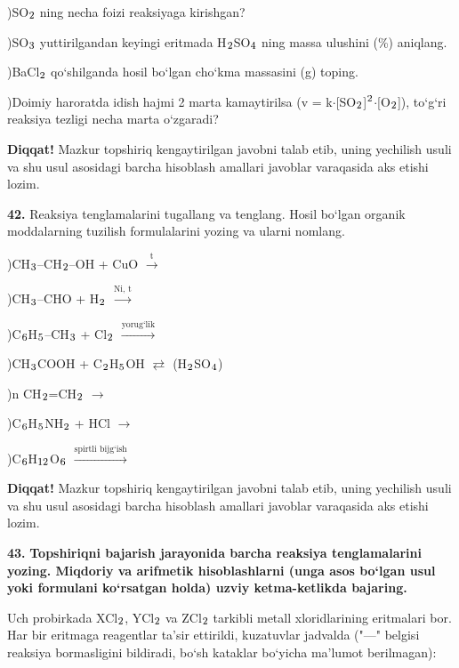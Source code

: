 \documentclass[11pt,a4paper]{article}
\renewcommand{\textsubscript}[1]{\ensuremath{_{\text{\fontsize{8}{8}\selectfont #1}}}}
\renewcommand{\textsuperscript}[1]{\ensuremath{^{\text{\fontsize{8}{8}\selectfont #1}}}}
\newcommand{\diqqat}[1]{\par\smallskip\noindent\textbf{Diqqat!} #1\par\medskip}
\begin{document}
)SO\textsubscript{2} ning necha foizi reaksiyaga kirishgan?\par
{})SO\textsubscript{3} yuttirilgandan keyingi eritmada H\textsubscript{2}SO\textsubscript{4} ning massa ulushini (\%) aniqlang.\par
{})BaCl\textsubscript{2} qo`shilganda hosil bo`lgan cho`kma massasini (g) toping.\par
{})Doimiy haroratda idish hajmi 2 marta kamaytirilsa (v = k$\cdot$[SO\textsubscript{2}]\textsuperscript{2}$\cdot$[O\textsubscript{2}]), to`g`ri reaksiya tezligi necha marta o`zgaradi?\par
\diqqat{Mazkur topshiriq kengaytirilgan javobni talab etib, uning yechilish usuli va shu usul asosidagi barcha hisoblash amallari javoblar varaqasida aks etishi lozim.}
\noindent\textbf{42.} Reaksiya tenglamalarini tugallang va tenglang. Hosil bo`lgan organik moddalarning tuzilish formulalarini yozing va ularni nomlang.\par
{})CH\textsubscript{3}--CH\textsubscript{2}--OH + CuO $\xrightarrow{\text{t}}$\par
{})CH\textsubscript{3}--CHO + H\textsubscript{2} $\xrightarrow{\text{Ni, t}}$\par
{})C\textsubscript{6}H\textsubscript{5}--CH\textsubscript{3} + Cl\textsubscript{2} $\xrightarrow{\text{yorug`lik}}$\par
{})CH\textsubscript{3}COOH + C\textsubscript{2}H\textsubscript{5}OH $\rightleftarrows$ (H\textsubscript{2}SO\textsubscript{4})\par
{})n CH\textsubscript{2}=CH\textsubscript{2} $\to$\par
{})C\textsubscript{6}H\textsubscript{5}NH\textsubscript{2} + HCl $\to$\par
{})C\textsubscript{6}H\textsubscript{12}O\textsubscript{6} $\xrightarrow{\text{spirtli bijg`ish}}$\par
\diqqat{Mazkur topshiriq kengaytirilgan javobni talab etib, uning yechilish usuli va shu usul asosidagi barcha hisoblash amallari javoblar varaqasida aks etishi lozim.}
\noindent\textbf{43.} \textbf{Topshiriqni bajarish jarayonida barcha reaksiya tenglamalarini yozing. Miqdoriy va arifmetik hisoblashlarni (unga asos bo`lgan usul yoki formulani ko`rsatgan holda) uzviy ketma-ketlikda bajaring.}\par\smallskip
Uch probirkada XCl\textsubscript{2}, YCl\textsubscript{2} va ZCl\textsubscript{2} tarkibli metall xloridlarining eritmalari bor. Har bir eritmaga reagentlar ta'sir ettirildi, kuzatuvlar jadvalda ("---" belgisi reaksiya bormasligini bildiradi, bo`sh kataklar bo`yicha ma'lumot berilmagan):\par
\end{document}
